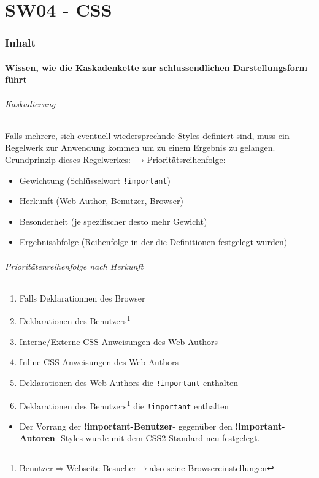\part{SW04 - CSS}
\section{Inhalt}
\subsection{Wissen, wie die \textbf{Kaskadenkette} zur schlussendlichen Darstellungsform führt}
\paragraph{Kaskadierung}Falls mehrere, sich eventuell wiedersprechnde Styles definiert sind, muss ein Regelwerk zur Anwendung kommen um zu einem Ergebnis zu gelangen.
\noindent
Grundprinzip dieses Regelwerkes: $\rightarrow$Prioritätsreihenfolge:
\begin{itemize}[noitemsep,topsep=0pt,leftmargin=*]
    \item Gewichtung (Schlüsselwort \texttt{!important})
    \item Herkunft (Web-Author, Benutzer, Browser)
    \item Besonderheit (je spezifischer desto mehr Gewicht)
    \item Ergebnisabfolge (Reihenfolge in der die Definitionen festgelegt wurden)
\end{itemize}

\paragraph{Prioritätenreihenfolge nach Herkunft}
\begin{enumerate}[noitemsep,topsep=0pt,leftmargin=*]
    \item Falls Deklarationnen des Browser
    \item Deklarationen des Benutzers\footnote{Benutzer$\Rightarrow$Webseite Besucher$\rightarrow$also seine Browsereinstellungen}
    \item Interne/Externe CSS-Anweisungen des Web-Authors
    \item Inline CSS-Anweisungen des Web-Authors
    \item Deklarationen des Web-Authors die \texttt{!important} enthalten
    \item Deklarationen des Benutzers\textsuperscript{1} die \texttt{!important} enthalten
\end{enumerate}
\begin{itemize}[noitemsep,topsep=0pt,leftmargin=*]
    \item Der Vorrang der \textbf{!important-Benutzer}- gegenüber den \textbf{!important-Autoren}- Styles wurde mit dem CSS2-Standard neu festgelegt.
\end{itemize}

